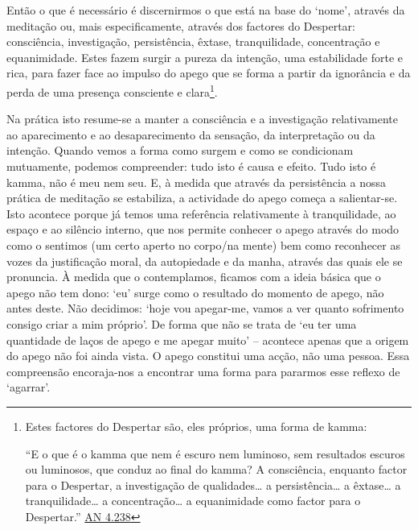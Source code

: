 Então o que é necessário é discernirmos o que está na base do `nome', através da meditação ou, mais especificamente, através dos factores do Despertar: consciência, investigação, persistência, êxtase, tranquilidade, concentração e equanimidade. Estes fazem surgir a pureza da intenção, uma estabilidade forte e rica, para fazer face ao impulso do apego que se forma a partir da ignorância e da perda de uma presença consciente e clara\footnote{Estes factores do Despertar são, eles próprios, uma forma de kamma:

  ``E o que é o kamma que nem é escuro nem luminoso, sem resultados escuros ou luminosos, que conduz ao final do kamma? A consciência, enquanto factor para o Despertar, a investigação de qualidades\ldots{} a persistência\ldots{} a êxtase\ldots{} a tranquilidade\ldots{} a concentração\ldots{} a equanimidade como factor para o Despertar.'' \href{https://suttacentral.net/an4.238/en/sujato}{AN 4.238}}.

Na prática isto resume-se a manter a consciência e a investigação relativamente ao aparecimento e ao desaparecimento da sensação, da interpretação ou da intenção. Quando vemos a forma como surgem e como se condicionam mutuamente, podemos compreender: tudo isto é causa e efeito. Tudo isto é kamma, não é meu nem seu. E, à medida que através da persistência a nossa prática de meditação se estabiliza, a actividade do apego começa a salientar-se. Isto acontece porque já temos uma referência relativamente à tranquilidade, ao espaço e ao silêncio interno, que nos permite conhecer o apego através do modo como o sentimos (um certo aperto no corpo/na mente) bem como reconhecer as vozes da justificação moral, da autopiedade e da manha, através das quais ele se pronuncia. À medida que o contemplamos, ficamos com a ideia básica que o apego não tem dono: `eu' surge como o resultado do momento de apego, não antes deste. Não decidimos: `hoje vou apegar-me, vamos a ver quanto sofrimento consigo criar a mim próprio'. De forma que não se trata de `eu ter uma quantidade de laços de apego e me apegar muito' -- acontece apenas que a origem do apego não foi ainda vista. O apego constitui uma acção, não uma pessoa. Essa compreensão encoraja-nos a encontrar uma forma para pararmos esse reflexo de `agarrar'.


